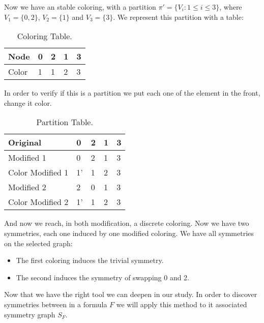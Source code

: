 \begin{example}
Now we have an stable coloring, with a partition $\pi' = \{V_i: 1\le i\le 3\}$, where $V_1 = \{0,2\}$, $V_2 = \{1\}$ and $V_3 = \{3\}$. We represent this partition with a table:


\begin{table}[h]
  \begin{center}
    \begin{tabular}{|l|l|l|l|l|}
      \hline
      Node & 0 & 2 & 1 & 3 \\
      \hline
      Color & 1 & 1 & 2 & 3 \\
      \hline

    \end{tabular}
  \end{center}
  \caption{Coloring Table.}
\end{table}



In order to verify if this is a partition we put each one of the element in the front, change it color.

\begin{table}[h]
  \begin{center}
    \begin{tabular}{|l|l|l|l|l|}
      \hline
      Original & 0 & 2 & 1 & 3 \\
      \hline
      Modified 1 & 0 & 2 & 1 & 3 \\
      \hline
      Color Modified 1& 1'  & 1 & 2 & 3 \\
      \hline
      Modified 2 & 2 & 0 & 1 & 3 \\
      \hline
      Color Modified 2& 1'  & 1 & 2 & 3 \\
      \hline
    \end{tabular}
  \end{center}
  \caption{Partition Table.}
\end{table}

And now we reach, in both modification, a discrete coloring. Now we have two symmetries, each one induced by one modified coloring. We have all symmetries on the selected graph:
\begin{itemize}
\item The first coloring induces the trivial symmetry.
\item The second induces the symmetry of swapping 0 and 2.
\end{itemize}

\end{example}

Now that we have the right tool we can deepen in our study. In order to discover symmetries between in a formula $F$  we will apply this method to it associated symmetry graph $S_F$.

